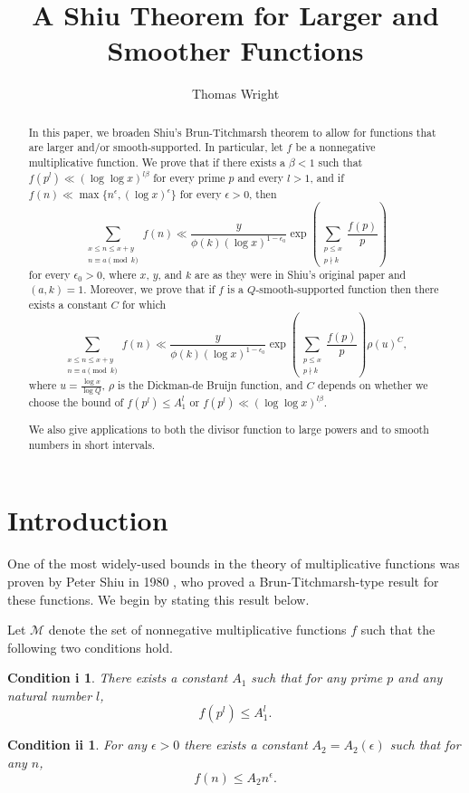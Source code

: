 \documentclass{amsart}
\newtheorem*{condi}{Condition i}
\newtheorem*{condii}{Condition ii}
\begin{document}
\title{A Shiu Theorem for Larger and Smoother Functions}
\author[T. Wright]{Thomas Wright}
\begin{abstract}
In this paper, we broaden Shiu's Brun-Titchmarsh theorem to allow for functions that are larger and/or smooth-supported.  In particular, let $f$ be a nonnegative multiplicative function.  We prove that if there exists a $\beta<1$ such that $f(p^l)\ll (\log\log x)^{l\beta}$ for every prime $p$ and every $l>1$, and if $f(n)\ll \max\{n^\epsilon,(\log x)^\epsilon\}$ for every $\epsilon>0$, then
$$\sum_{\substack{x\leq n\leq x+y \\ n\equiv a\pmod k}}f(n)\ll \frac{y}{\phi(k)(\log x)^{1-\epsilon_0}}\exp\left(\sum_{\substack{p\leq x \\ p\nmid k}}\frac{f(p)}{p}\right)$$
for every $\epsilon_0>0$, where $x$, $y$, and $k$ are as they were in Shiu's original paper and $(a,k)=1$.  Moreover, we prove that if $f$ is a $Q$-smooth-supported function then there exists a constant $C$ for which
$$\sum_{\substack{x\leq n\leq x+y \\ n\equiv a\pmod k}}f(n)\ll \frac{y}{\phi(k)(\log x)^{1-\epsilon_0}}\exp\left(\sum_{\substack{p\leq x \\ p\nmid k}}\frac{f(p)}{p}\right)\rho(u)^C,$$
where $u=\frac{\log x}{\log Q}$, $\rho$ is the Dickman-de Bruijn function, and $C$ depends on whether we choose the bound of $f(p^l)\leq A_1^l$ or $f(p^l)\ll (\log\log x)^{l\beta}$.

We also give applications to both the divisor function to large powers and to smooth numbers in short intervals.
\end{abstract}
\maketitle


\section{Introduction}

One of the most widely-used bounds in the theory of multiplicative functions was proven by Peter Shiu in 1980 \cite{Sh}, who proved a Brun-Titchmarsh-type result for these functions.  We begin by stating this result below.

Let $\mathcal M$ denote the set of nonnegative multiplicative functions $f$ such that the following two conditions hold.  

\begin{condi}
There exists a constant $A_1$ such that for any prime $p$ and any natural number $l$,
$$f(p^l)\leq A_1^l.$$
\end{condi}
\begin{condii}
For any $\epsilon>0$ there exists a constant $A_2=A_2(\epsilon)$ such that for any $n$,
$$f(n)\leq A_2n^\epsilon.$$
\end{condii}
\end{document}
